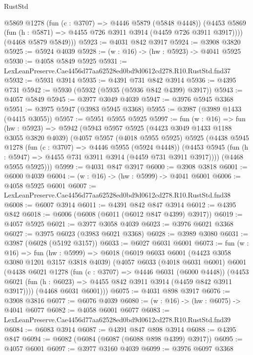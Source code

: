\begin{lexlean}{RustStd}
\begin{coremodule}
          @5869
          @1278
          (fun (c : @3707) => @4446 @5879 (@5848 @4448))
          (@4453 @5869 (fun (h : @5871) => @4455 @726 @3911 @3914 (@4459 @726 @3911 @3917))))
        (@4468 @5879 @5849)))
@5923 := @4031 @842 @3917
@5924 := @3908 @3820
@5925 := @5924 @4039
@5928 := (w : @16) -> (hw : @5923) -> @4041 @5925
@5930 := @4058 @5849 @5925
@5931 := LexLeanPreserve.Cae4456d77aa62528ed0bd9d0612cd278.R10.RustStd.fnd37
@5932 := @5931 @3914
@5935 := @4391 @731 @842 @3914
@5936 := @4395 @731
@5942 := @5930 (@5932 (@5935 (@5936 @842 @4399) @3917))
@5943 := @4057 @5849
@5945 := @3977 @3049 @4039
@5947 := @3976 @5945 @3368
@5951 := @3975 @5947 (@3983 @5945 @3368)
@5955 := @3987 (@3989 @1433 (@4415 @3055))
@5957 := @5951 @5955 @5925
@5997 := fun (w : @16) =>
  fun (hw : @5923) =>
  @5942
    (@5943
      @5957
      @5925
      (@4423 @3049 @1433 @1188 @3055 @3820 @4039)
      (@4057
        @5957
        (@4018 @5955 @5925)
        @5925
        (@4438
          @5945
          @1278
          (fun (c : @3707) => @4446 @5955 (@5924 @4448))
          (@4453 @5945 (fun (h : @5947) => @4455 @731 @3911 @3914 (@4459 @731 @3911 @3917))))
        (@4468 @5955 @5925)))
@5999 := @4031 @847 @3917
@6000 := @3908 @3818
@6001 := @6000 @4039
@6004 := (w : @16) -> (hw : @5999) -> @4041 @6001
@6006 := @4058 @5925 @6001
@6007 := LexLeanPreserve.Cae4456d77aa62528ed0bd9d0612cd278.R10.RustStd.fnd38
@6008 := @6007 @3914
@6011 := @4391 @842 @847 @3914
@6012 := @4395 @842
@6018 := @6006 (@6008 (@6011 (@6012 @847 @4399) @3917))
@6019 := @4057 @5925
@6021 := @3977 @3058 @4039
@6023 := @3976 @6021 @3368
@6027 := @3975 @6023 (@3983 @6021 @3368)
@6028 := @3989 @3080
@6031 := @3987 (@6028 (@5192 @3157))
@6033 := @6027 @6031 @6001
@6073 := fun (w : @16) =>
  fun (hw : @5999) =>
  @6018
    (@6019
      @6033
      @6001
      (@4423 @3058 @3080 @1201 @3157 @3818 @4039)
      (@4057
        @6033
        (@4018 @6031 @6001)
        @6001
        (@4438
          @6021
          @1278
          (fun (c : @3707) => @4446 @6031 (@6000 @4448))
          (@4453 @6021 (fun (h : @6023) => @4455 @842 @3911 @3914 (@4459 @842 @3911 @3917))))
        (@4468 @6031 @6001)))
@6075 := @4031 @898 @3917
@6076 := @3908 @3816
@6077 := @6076 @4039
@6080 := (w : @16) -> (hw : @6075) -> @4041 @6077
@6082 := @4058 @6001 @6077
@6083 := LexLeanPreserve.Cae4456d77aa62528ed0bd9d0612cd278.R10.RustStd.fnd39
@6084 := @6083 @3914
@6087 := @4391 @847 @898 @3914
@6088 := @4395 @847
@6094 := @6082 (@6084 (@6087 (@6088 @898 @4399) @3917))
@6095 := @4057 @6001
@6097 := @3977 @3160 @4039
@6099 := @3976 @6097 @3368

\end{coremodule}
\end{lexlean}
